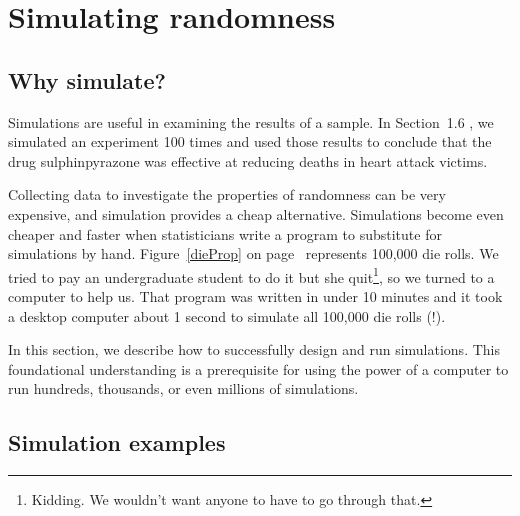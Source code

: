 \section{Simulating randomness}
\label{simulateRandomness}

\subsection{Why simulate?}

Simulations are useful in examining the results of a sample. In Section~1.6%
, we simulated an experiment 100 times and used those results to conclude that the drug sulphinpyrazone was effective at reducing deaths in heart attack victims.

Collecting data to investigate the properties of randomness can be very expensive, and simulation provides a cheap alternative. Simulations become even cheaper and faster when statisticians write a program to substitute for simulations by hand. %
Figure~\ref{dieProp} on page~\pageref{dieProp} represents 100,000 die rolls. We tried to pay an undergraduate student to do it but she quit\footnote{Kidding. We wouldn't want anyone to have to go through that.}, so we turned to a computer to help us. That program was written in under 10 minutes and it took a desktop computer about 1 second to simulate all 100,000 die rolls (!).

In this section, we describe how to successfully design and run simulations. This foundational understanding is a prerequisite for using the power of a computer to run hundreds, thousands, or even millions of simulations.

\subsection{Simulation examples}

